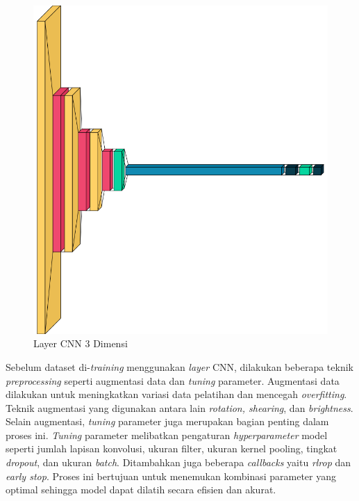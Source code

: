 \begin{figure} [ht] \centering
  \includegraphics[scale=0.25]{gambar/bab3/3dlayer.png}
  \caption{Layer CNN 3 Dimensi}
  \label{fig:3dlayer}
\end{figure}

Sebelum dataset di-\emph{training} menggunakan \emph{layer} CNN, dilakukan beberapa teknik \emph{preprocessing} seperti augmentasi data dan \emph{tuning} parameter. Augmentasi data dilakukan untuk meningkatkan variasi data pelatihan dan mencegah \emph{overfitting}. Teknik augmentasi yang digunakan antara lain \emph{rotation, shearing}, dan \emph{brightness}. Selain augmentasi, \emph{tuning} parameter juga merupakan bagian penting dalam proses ini. \emph{Tuning} parameter melibatkan pengaturan \emph{hyperparameter} model seperti jumlah lapisan konvolusi, ukuran filter, ukuran kernel pooling, tingkat \emph{dropout}, dan ukuran \emph{batch}. Ditambahkan juga beberapa \emph{callbacks} yaitu \emph{rlrop} dan \emph{early stop}. Proses ini bertujuan untuk menemukan kombinasi parameter yang optimal sehingga model dapat dilatih secara efisien dan akurat.

